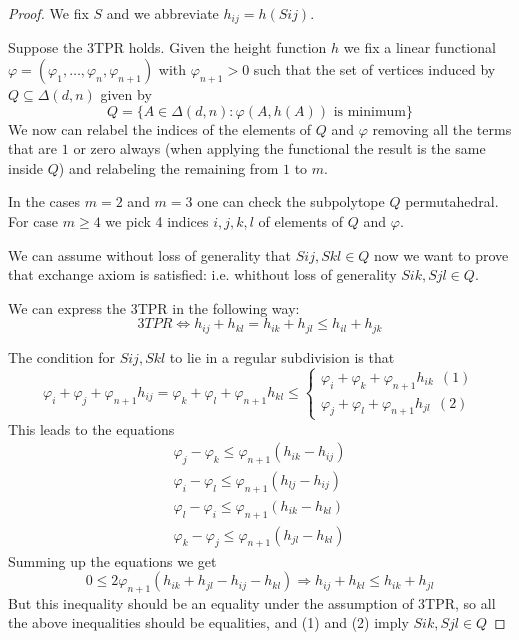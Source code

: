 \documentclass[leqno]{article}
\numberwithin{equation}{section}
\numberwithin{theorem}{section}
\begin{document}
\begin{proof}
We fix $S$ and we abbreviate $h_{ij} = h(Sij)$.

Suppose the 3TPR holds. Given the height function $h$ we fix a linear functional $\varphi = (\varphi _1, \ldots, \varphi _n, \varphi _{n+1})$ with $\varphi _{n+1}>0$ such that the set of vertices induced by $Q\subseteq \Delta(d, n)$ given by
\[
Q = \{A\in \Delta(d, n) : \varphi (A, h(A)) \text{ is minimum}\}
\] 
We now can relabel the indices of the elements of $Q$ and $\varphi $ removing all the terms that are $1$ or zero always (when applying the functional the result is the same inside $Q$) and relabeling the remaining from $1$ to  $m$.

In the cases $m = 2$ and  $m=3$ one can check the subpolytope $Q$ permutahedral. For case $m\ge 4$ we pick 4 indices $i, j, k, l$ of elements of $Q$ and $\varphi $. 

We can assume without loss of generality that $Sij, Skl \in Q$ now we want to prove that exchange axiom is satisfied: i.e. whithout loss of generality $Sik, Sjl\in Q$.

We can express the 3TPR in the following way:
\[
  3TPR \iff h_{ij} + h_{kl} = h_{ik} + h_{jl}\le h_{il} + h_{jk}
\] 

The condition for $Sij, Skl$ to lie in a regular subdivision is that
\[
\varphi _i + \varphi _j + \varphi _{n+1} h_{ij} = 
\varphi _k + \varphi _l + \varphi _{n+1} h_{kl} \le 
\begin{cases}
  \varphi _i + \varphi _k + \varphi _{n+1}h_{ik}\ \  (1)\\
  \varphi _j + \varphi _l + \varphi _{n+1}h_{jl} \ \   (2)
\end{cases}
\] 
This leads to the equations
\begin{align*}
 \varphi _j - \varphi _k \le \varphi _{n+1}(h_{ik}-h_{ij})  \\
 \varphi _i - \varphi _l \le \varphi _{n+1}(h_{lj}-h_{ij})  \\
 \varphi _l - \varphi _i \le \varphi _{n+1}(h_{ik}-h_{kl})  \\
 \varphi _k - \varphi _j \le \varphi _{n+1}(h_{jl}-h_{kl})
\end{align*}
Summing up the equations we get
\[
0\le 2\varphi_{n+1}(h_{ik}+ h_{jl} - h_{ij}-h_{kl}) \Rightarrow h_{ij} + h_{kl} \le h_{ik} + h_{jl}
\] 
But this inequality should be an equality under the assumption of 3TPR, so all the above inequalities should be equalities, and (1) and (2) imply $Sik, Sjl\in Q$
\end{proof}
\end{document}
